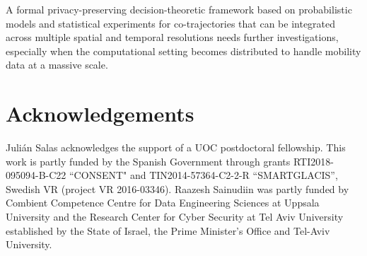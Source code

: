 \documentclass[times,twocolumn,final,authoryear]{elsarticle}
\begin{document}
A formal privacy-preserving decision-theoretic framework based on probabilistic models and statistical experiments for co-trajectories that can be integrated across multiple spatial and temporal resolutions needs further investigations, especially when the computational setting becomes distributed to handle mobility data at a massive scale.

\section*{Acknowledgements}
Juli\'{a}n Salas acknowledges the support of a UOC postdoctoral fellowship.
This work is partly funded by the Spanish Government through grants  RTI2018-095094-B-C22 ``CONSENT" and TIN2014-57364-C2-2-R ``SMARTGLACIS'', Swedish VR (project VR 2016-03346). Raazesh Sainudiin was partly funded by Combient Competence Centre for Data Engineering Sciences at Uppsala University and the Research Center for Cyber Security at Tel Aviv University established by the State of Israel, the Prime Minister's Office and Tel-Aviv University.






\end{document}
